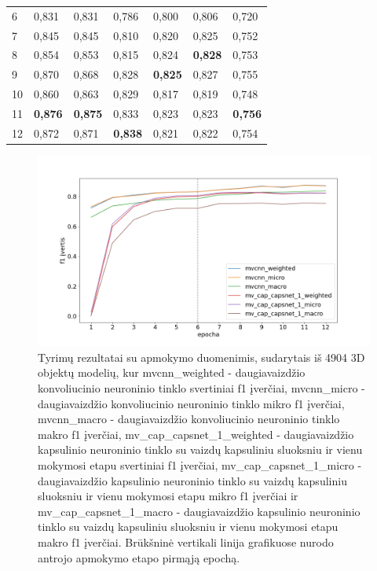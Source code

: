 \begin{table}[]
\begin{tabular}{l|l|l|l|l|l|l}
		6 &          0,831 &       0,831 &       0,786 &                     0,800 &                  0,806 &                  0,720 \\
		7 &          0,845 &       0,845 &       0,810 &                     0,820 &                  0,825 &                  0,752 \\
		8 &          0,854 &       0,853 &       0,815 &                     0,824 &                  \textbf{0,828} &                  0,753 \\
		9 &          0,870 &       0,868 &       0,828 &                     \textbf{0,825} &                  0,827 &                  0,755 \\
		10 &          0,860 &       0,863 &       0,829 &                     0,817 &                  0,819 &                  0,748 \\
		11 &          \textbf{0,876} &       \textbf{0,875} &       0,833 &                     0,823 &                  0,823 &                  \textbf{0,756} \\
		12 &          0,872 &       0,871 &       \textbf{0,838} &                     0,821 &                  0,822 &                  0,754 \\
	\end{tabular}
	\label{tbl:half_sample_f1}
\end{table}

\begin{figure}[H]
	\centering
	\includegraphics[scale=0.4]{img/half_sample_f1.png}
	\caption{
		Tyrimų rezultatai su apmokymo duomenimis, sudarytais iš 4904 3D objektų modelių, kur mvcnn\_weighted -  daugiavaizdžio konvoliucinio neuroninio tinklo svertiniai f1 įverčiai, 
		mvcnn\_micro -  daugiavaizdžio konvoliucinio neuroninio tinklo mikro f1 įverčiai, 
		mvcnn\_macro -  daugiavaizdžio konvoliucinio neuroninio tinklo makro f1 įverčiai, 
		mv\_cap\_capsnet\_1\_weighted - daugiavaizdžio kapsulinio neuroninio tinklo su vaizdų kapsuliniu sluoksniu ir vienu mokymosi etapu svertiniai f1 įverčiai, 
		mv\_cap\_capsnet\_1\_micro - daugiavaizdžio kapsulinio neuroninio tinklo su vaizdų kapsuliniu sluoksniu ir vienu mokymosi etapu mikro f1 įverčiai ir
		mv\_cap\_capsnet\_1\_macro - daugiavaizdžio kapsulinio neuroninio tinklo su vaizdų kapsuliniu sluoksniu ir vienu mokymosi etapu makro f1 įverčiai. Brūkšninė vertikali linija grafikuose nurodo antrojo apmokymo etapo pirmąją epochą.
	}
	\label{img:half_sample_f1}
\end{figure}

